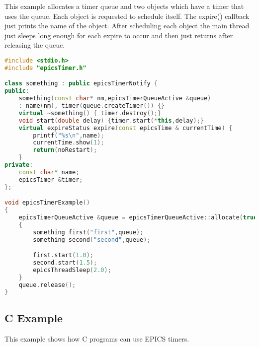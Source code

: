 This example allocates a timer queue and two objects which have a timer that uses the queue. Each object is requested to 
schedule itself. The expire() callback just prints the name of the object. After scheduling each object the main thread just 
sleeps long enough for each expire to occur and then just returns after releasing the queue.

\begin{lstlisting}[language=C++]
#include <stdio.h>
#include "epicsTimer.h"

class something : public epicsTimerNotify {
public:
    something(const char* nm,epicsTimerQueueActive &queue)
    : name(nm), timer(queue.createTimer()) {}
    virtual ~something() { timer.destroy();}
    void start(double delay) {timer.start(*this,delay);}
    virtual expireStatus expire(const epicsTime & currentTime) {
        printf("%s\n",name);
        currentTime.show(1);
        return(noRestart);
    }
private:
    const char* name;
    epicsTimer &timer;
};

void epicsTimerExample()
{
    epicsTimerQueueActive &queue = epicsTimerQueueActive::allocate(true);
    {
        something first("first",queue);
        something second("second",queue);

        first.start(1.0);
        second.start(1.5);
        epicsThreadSleep(2.0);
    }
    queue.release();
}
\end{lstlisting}

\subsection{C Example}

This example shows how C programs can use EPICS timers.

